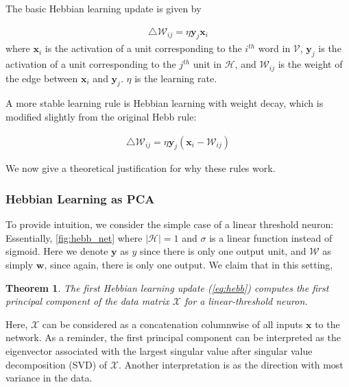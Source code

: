 \documentclass[12pt, usenames]{article}
\newtheorem{theorem}{Theorem}[section]
\theoremstyle{definition}
\theoremstyle{definition}
\theoremstyle{definition}
\newcommand{\mc}[1]
{\mathcal{#1}}
\newcommand{\vv}[1]
{\textbf{#1}}
\begin{document}

The basic Hebbian learning update is given by 

\begin{align}
\label{eq:hebb}
\triangle \mc{W}_{ij} = \eta \vv{y}_j \vv{x}_i
\end{align}
where $\vv{x}_i$ is the activation of a unit corresponding to the $i^{th}$ word in $\mc{V}$, $\vv{y}_j$ is the activation of a unit corresponding to the $j^{th}$ unit in $\mc{H}$, and $\mc{W}_{ij}$ is the weight of the edge between $\vv{x}_i$ and $\vv{y}_j$. $\eta$ is the learning rate. 

A more stable learning rule is Hebbian learning with weight decay, which is modified slightly from the original Hebb rule: 

\begin{align}
\label{eq:hebb2}
\triangle \mc{W}_{ij} = \eta \vv{y}_j (\vv{x}_i - \mc{W}_{ij})
\end{align}

We now give a theoretical justification for why these rules work. 

\subsubsection{Hebbian Learning as PCA}
To provide intuition, we consider the simple case of a linear threshold neuron: Essentially, \autoref{fig:hebb_net} where $|\mc{H}| = 1$ and $\sigma$ is a linear function instead of sigmoid. Here we denote $\vv{y}$ as $y$ since there is only one output unit, and $\mc{W}$ as simply $\vv{w}$, since again, there is only one output. We claim that in this setting, 
\begin{theorem} 
\label{thm:1}
The first Hebbian learning update (\autoref{eq:hebb}) computes the first principal component of the data matrix $\mc{X}$ for a linear-threshold neuron. 
\end{theorem}
Here, $\mc{X}$ can be considered as a concatenation columnwise of all inputs $\vv{x}$ to the network.
As a reminder, the first principal component can be interpreted as the eigenvector associated with the largest singular value after singular value decomposition (SVD) of $\mc{X}$. Another interpretation is as the direction with most variance in the data.
\end{document}
